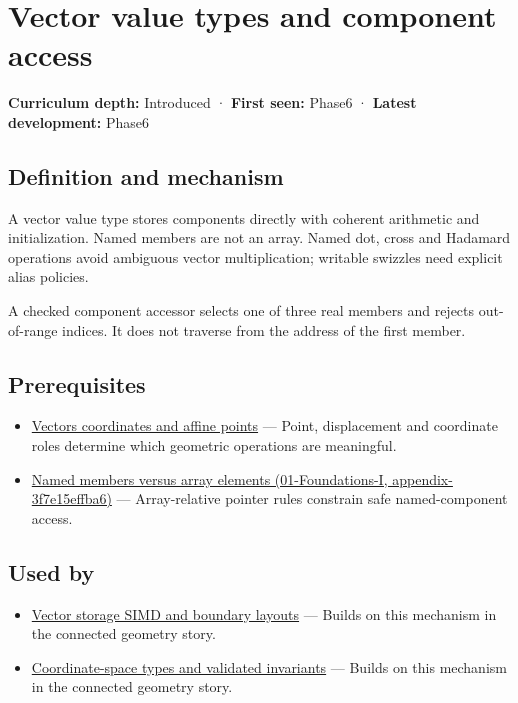 \hypertarget{appendix-37a39984ba66}{}
\section{Vector value types and component access}\label{appendix-37a39984ba66-vector-value-types-and-component-access}

\textbf{Curriculum depth:} Introduced · \textbf{First seen:} Phase6 · \textbf{Latest development:} Phase6

\subsection{Definition and mechanism}\label{appendix-37a39984ba66-definition-and-mechanism}

A vector value type stores components directly with coherent arithmetic and initialization. Named members are not an array. Named dot, cross and Hadamard operations avoid ambiguous vector multiplication; writable swizzles need explicit alias policies.

A checked component accessor selects one of three real members and rejects out-of-range indices. It does not traverse from the address of the first member.

\subsection{Prerequisites}\label{appendix-37a39984ba66-prerequisites}

\begin{itemize}
\tightlist
\item
  \hyperref[appendix-0659864c0aa3]{Vectors coordinates and affine points} --- Point, displacement and coordinate roles determine which geometric operations are meaningful.
\item
  \href{../01-Foundations-I/main.pdf\#nameddest=appendix-3f7e15effba6}{Named members versus array elements (01-Foundations-I, appendix-3f7e15effba6)} --- Array-relative pointer rules constrain safe named-component access.
\end{itemize}

\subsection{Used by}\label{appendix-37a39984ba66-used-by}

\begin{itemize}
\tightlist
\item
  \hyperref[appendix-26bf6bf2fb8b]{Vector storage SIMD and boundary layouts} --- Builds on this mechanism in the connected geometry story.
\item
  \hyperref[appendix-380a220e2529]{Coordinate-space types and validated invariants} --- Builds on this mechanism in the connected geometry story.
\end{itemize}


